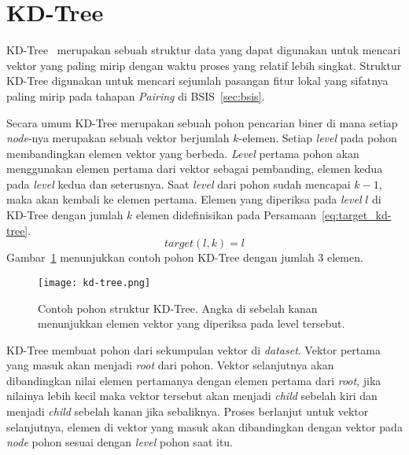 \section{KD-Tree}
\label{sec:kdtree}
KD-Tree~\cite{bentley1975multidimensional} merupakan sebuah struktur data yang dapat digunakan untuk mencari vektor yang paling mirip dengan waktu proses yang relatif lebih singkat. Struktur KD-Tree digunakan untuk mencari sejumlah pasangan fitur lokal yang sifatnya paling mirip pada tahapan \textit{Pairing} di BSIS~\ref{sec:bsis}. 

Secara umum KD-Tree merupakan sebuah pohon pencarian biner di mana setiap \textit{node}-nya merupakan sebuah vektor berjumlah $k$-elemen. Setiap \textit{level} pada pohon membandingkan elemen vektor yang berbeda. \textit{Level} pertama pohon akan menggunakan elemen pertama dari vektor sebagai pembanding, elemen kedua pada \textit{level} kedua dan seterusnya. Saat \textit{level} dari pohon sudah mencapai $k - 1$, maka akan kembali ke elemen pertama. Elemen yang diperiksa pada \textit{level} $l$ di KD-Tree dengan jumlah $k$ elemen didefinisikan pada Persamaan~\ref{eq:target_kd-tree}.
\begin{equation}
	\label{eq:target_kd-tree}
	target(l, k) = l %
\end{equation}
Gambar~\ref{fig:kd-tree} menunjukkan contoh pohon KD-Tree dengan jumlah 3 elemen.
\begin{figure}[H]
	\centering
	\texttt{[image: kd-tree.png]}
	\caption{Contoh pohon struktur KD-Tree. Angka di sebelah kanan menunjukkan elemen vektor yang diperiksa pada level tersebut.}
	\label{fig:kd-tree}
\end{figure}

KD-Tree membuat pohon dari sekumpulan vektor di \textit{dataset}. Vektor pertama yang masuk akan menjadi \textit{root} dari pohon. Vektor selanjutnya akan dibandingkan nilai elemen pertamanya dengan elemen pertama dari \textit{root}, jika nilainya lebih kecil maka vektor tersebut akan menjadi \textit{child} sebelah kiri dan menjadi \textit{child} sebelah kanan jika sebaliknya. Proses berlanjut untuk vektor selanjutnya, elemen di vektor yang masuk akan dibandingkan dengan vektor pada \textit{node} pohon sesuai dengan \textit{level} pohon saat itu. 

